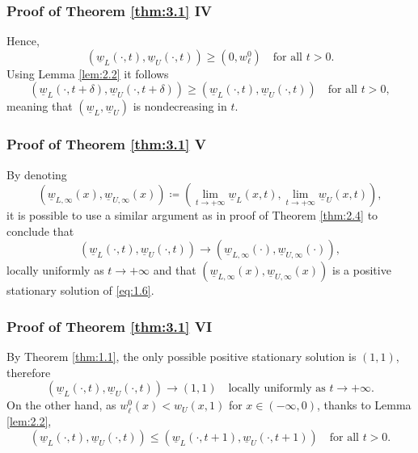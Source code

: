
\begin{frame}
    \frametitle{Proof of Theorem \ref{thm:3.1} IV}
    \begin{proofc}
        Hence,
        \begin{equation*}
            (\underline{w}_L(\cdot, t), \underline{w}_U(\cdot, t)) \geq (0, w_\ell^0) \quad \text{for all } t > 0.
        \end{equation*}
        Using Lemma \ref{lem:2.2} it follows
        \begin{equation*}
            (\underline{w}_L(\cdot, t + \delta), \underline{w}_U(\cdot, t + \delta)) \geq (\underline{w}_L(\cdot, t), \underline{w}_U(\cdot, t)) \quad \text{for all } t > 0,
        \end{equation*}
        meaning that \((\underline{w}_L, \underline{w}_U)\) is nondecreasing in \(t\). 
    \end{proofc}
\end{frame}


\begin{frame}
    \frametitle{Proof of Theorem \ref{thm:3.1} V}
    \begin{proofc}
        By denoting 
        \[
            \left(\underline{w}_{L, \infty}(x), \underline{w}_{U, \infty}(x)\right) \coloneqq \left(\lim_{t \to +\infty} \underline{w}_L(x, t), \lim_{t \to +\infty} \underline{w}_U(x, t)\right), 
        \]
        it is possible to use a similar argument as in proof of Theorem \ref{thm:2.4} to conclude that
        \[
            (\underline{w}_{L}(\cdot, t), \underline{w}_{U}(\cdot, t)) \to (\underline{w}_{L, \infty}(\cdot), \underline{w}_{U, \infty}(\cdot)),
        \]
        locally uniformly as \(t \to +\infty\) and that \((\underline{w}_{L, \infty}(x), \underline{w}_{U, \infty}(x))\) is a positive stationary solution of \eqref{eq:1.6}. 
    \end{proofc}
\end{frame}


\begin{frame}
    \frametitle{Proof of Theorem \ref{thm:3.1} VI}
    \begin{proofc}
        By Theorem \ref{thm:1.1}, the only possible positive stationary solution is \((1, 1)\), therefore
        \begin{equation}
            (\underline{w}_{L}(\cdot, t), \underline{w}_{U}(\cdot, t)) \to (1, 1) \quad \text{locally uniformly as } t \to +\infty.
            \label{eq:3.4}
        \end{equation}
        On the other hand, as \(w_\ell^0(x) < w_U(x, 1)\) for \(x \in (-\infty, 0)\), thanks to Lemma \ref{lem:2.2},
        \[
            (\underline{w}_L(\cdot, t), \underline{w}_U(\cdot, t)) \leq (\underline{w}_L(\cdot, t + 1), \underline{w}_U(\cdot, t + 1)) \quad \text{for all } t > 0.
        \]
    \end{proofc}
\end{frame}


